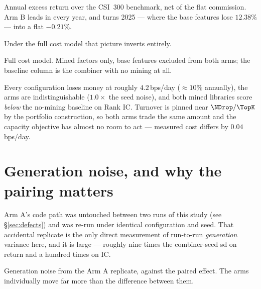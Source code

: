 \documentclass[11pt,a4paper]{article}
\begin{document}
\vspace{-0.6em}
\begin{table}[htbp]\centering
\caption{Annual excess return over the CSI~300 benchmark, net of the flat
commission. Arm B leads in every year, and turns 2025 --- where the base
features lose $12.38\%$ --- into a flat $-0.21\%$.}
\label{tab:yarr}
\small\begin{adjustbox}{max width=\textwidth}\TblYearlyARR\end{adjustbox}
\end{table}

\vspace{-0.6em}
Under the full cost model that picture inverts entirely.

\begin{table}[htbp]\centering
\caption{Full cost model. Mined factors only, base features excluded from both
arms; the baseline column is the combiner with no mining at all.}
\label{tab:etheta}
\small\begin{adjustbox}{max width=\textwidth}\TblEtheta\end{adjustbox}
\end{table}

\vspace{-0.4em}
Every configuration loses money at roughly $4.2$\,bps/day ($\approx10\%$
annually), the arms are indistinguishable ($1.0\times$ the seed noise), and both
mined libraries score \emph{below} the no-mining baseline on Rank IC. Turnover is
pinned near $\NDrop/\TopK$ by the portfolio construction, so both arms trade the
same amount and the capacity objective has almost no room to act --- measured
cost differs by $0.04$\,bps/day.

\section{Generation noise, and why the pairing matters}
\label{sec:pairing}

Arm A's code path was untouched between two runs of this study (see
\S\ref{sec:defects}) and was re-run under identical configuration and seed. That
accidental replicate is the only direct measurement of run-to-run
\emph{generation} variance here, and it is large --- roughly nine times the
combiner-seed sd on return and a hundred times on IC.

\begin{table}[htbp]\centering
\caption{Generation noise from the Arm A replicate, against the paired effect.
The arms individually move far more than the difference between them.}
\label{tab:pairing}
\small\begin{adjustbox}{max width=\textwidth}\TblPairing\end{adjustbox}
\end{table}
\end{document}
